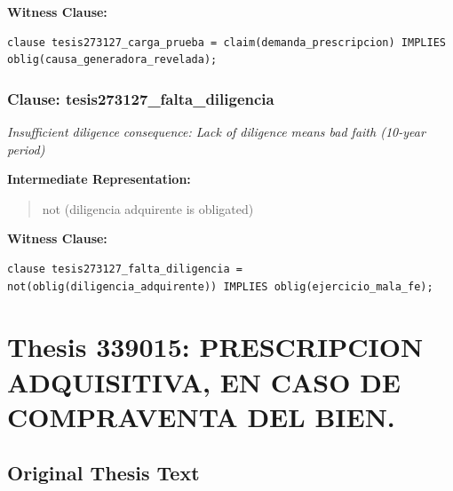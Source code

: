 \documentclass[11pt,a4paper]{article}
\begin{document}
\textbf{Witness Clause:}

\begin{lstlisting}[style=witnessstyle, language=Witness]
clause tesis273127_carga_prueba = claim(demanda_prescripcion) IMPLIES oblig(causa_generadora_revelada);
\end{lstlisting}

\subsubsection{Clause: tesis273127\_falta\_diligencia}

\textit{Insufficient diligence consequence: Lack of diligence means bad faith (10-year period)}

\textbf{Intermediate Representation:}

\begin{quote}
not (diligencia adquirente is obligated)
\end{quote}

\textbf{Witness Clause:}

\begin{lstlisting}[style=witnessstyle, language=Witness]
clause tesis273127_falta_diligencia = not(oblig(diligencia_adquirente)) IMPLIES oblig(ejercicio_mala_fe);
\end{lstlisting}

\newpage

\section{Thesis 339015: PRESCRIPCION ADQUISITIVA, EN CASO DE COMPRAVENTA DEL BIEN.}
\label{thesis:339015}

\subsection{Original Thesis Text}
\end{document}
